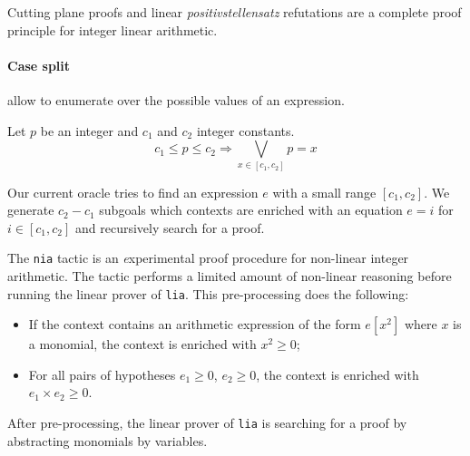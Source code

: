 Cutting plane proofs and linear \emph{positivstellensatz} refutations are a complete proof principle for integer linear arithmetic.

\paragraph{Case split} allow to enumerate over the possible values of an expression. 
\begin{theorem}
  Let $p$ be an integer and $c_1$ and $c_2$  integer constants.
  \[
  c_1 \le p \le c_2 \Rightarrow \bigvee_{x \in [c_1,c_2]} p = x
  \]
\end{theorem}
Our current oracle tries to find an expression $e$ with a small range $[c_1,c_2]$.
%
We generate $c_2 - c_1$ subgoals which contexts are enriched with an equation $e = i$ for $i \in [c_1,c_2]$ and
recursively search for a proof.

\label{sec:nia}
The {\tt nia} tactic is an {\emph experimental} proof procedure for non-linear  integer arithmetic.
%
The tactic performs a limited amount of non-linear reasoning before running the
linear prover of {\tt lia}.
This pre-processing does the following:
\begin{itemize}
\item If the context contains an arithmetic expression of the form $e[x^2]$ where $x$ is a
  monomial, the context is enriched with $x^2\ge 0$;
\item For all pairs of hypotheses $e_1\ge 0$, $e_2 \ge 0$, the context is enriched with $e_1 \times e_2 \ge 0$.
\end{itemize}
After pre-processing, the linear prover of {\tt lia} is searching for a proof by abstracting monomials by variables.



